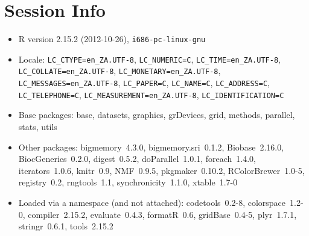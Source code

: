 \documentclass[a4paper]{article}\usepackage{graphicx, color}
\begin{document}
\section{Session Info}
\begin{itemize}\raggedright
  \item R version 2.15.2 (2012-10-26), \verb|i686-pc-linux-gnu|
  \item Locale: \verb|LC_CTYPE=en_ZA.UTF-8|, \verb|LC_NUMERIC=C|, \verb|LC_TIME=en_ZA.UTF-8|, \verb|LC_COLLATE=en_ZA.UTF-8|, \verb|LC_MONETARY=en_ZA.UTF-8|, \verb|LC_MESSAGES=en_ZA.UTF-8|, \verb|LC_PAPER=C|, \verb|LC_NAME=C|, \verb|LC_ADDRESS=C|, \verb|LC_TELEPHONE=C|, \verb|LC_MEASUREMENT=en_ZA.UTF-8|, \verb|LC_IDENTIFICATION=C|
  \item Base packages: base, datasets, graphics,
    grDevices, grid, methods, parallel, stats, utils
  \item Other packages: bigmemory~4.3.0,
    bigmemory.sri~0.1.2, Biobase~2.16.0,
    BiocGenerics~0.2.0, digest~0.5.2,
    doParallel~1.0.1, foreach~1.4.0, iterators~1.0.6,
    knitr~0.9, NMF~0.9.5, pkgmaker~0.10.2,
    RColorBrewer~1.0-5, registry~0.2, rngtools~1.1,
    synchronicity~1.1.0, xtable~1.7-0
  \item Loaded via a namespace (and not attached):
    codetools~0.2-8, colorspace~1.2-0,
    compiler~2.15.2, evaluate~0.4.3, formatR~0.6,
    gridBase~0.4-5, plyr~1.7.1, stringr~0.6.1,
    tools~2.15.2
\end{itemize}



\printbibliography[heading=bibintoc]
\end{document}
